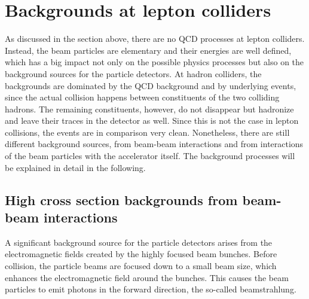 \section{Backgrounds at lepton colliders}
\label{Backgrounds}
As discussed in the section above, there are no QCD processes at lepton colliders.
Instead, the beam particles are elementary and their energies are well defined, which has a big impact not only on the possible physics processes but also on the background sources for the particle detectors.
At hadron colliders, the backgrounds are dominated by the QCD background and by underlying events, since the actual collision happens between constituents of the two colliding hadrons.
The remaining constituents, however, do not disappear but hadronize and leave their traces in the detector as well.
Since this is not the case in lepton collisions, the events are in comparison very clean.
Nonetheless, there are still different background sources, from beam-beam interactions and from interactions of the beam particles with the accelerator itself.
The background processes will be explained in detail in the following.

\subsection{High cross section backgrounds from beam-beam interactions}
\label{BeamBeam}
A significant background source for the particle detectors arises from the electromagnetic fields created by the highly focused beam bunches.
Before collision, the particle beams are focused down to a small beam size, which enhances the electromagnetic field around the bunches.
This causes the beam particles to emit photons in the forward direction, the so-called beamstrahlung.

